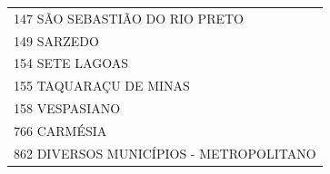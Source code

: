\documentclass{article}
\begin{document}
\begin{longtable}[c]{m{18cm}}
\multicolumn{1}{l}{ \hspace{2em} 147 SÃO SEBASTIÃO DO RIO PRETO } \\
\multicolumn{1}{l}{ \hspace{2em} 149 SARZEDO } \\
\multicolumn{1}{l}{ \hspace{2em} 154 SETE LAGOAS } \\
\multicolumn{1}{l}{ \hspace{2em} 155 TAQUARAÇU DE MINAS } \\
\multicolumn{1}{l}{ \hspace{2em} 158 VESPASIANO } \\
\multicolumn{1}{l}{ \hspace{2em} 766 CARMÉSIA } \\
\multicolumn{1}{l}{ \hspace{2em} 862 DIVERSOS MUNICÍPIOS - METROPOLITANO } \\
\end{longtable}
\newpage
\end{document}
